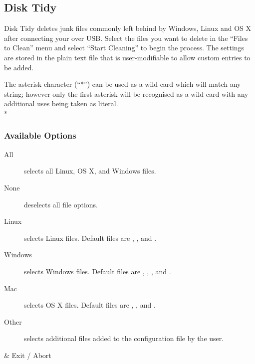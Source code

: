 \subsection{Disk Tidy}
  Disk Tidy deletes junk files commonly left behind by Windows, Linux and
  OS X after connecting your \dap{} over USB. Select the files you want to
  delete in the ``Files to Clean'' menu and select ``Start Cleaning'' to begin
  the process. The settings are stored in the plain text file
   that is user-modifiable to allow
  custom entries to be added.
  
  The asterisk character (``*'') can be used as a wild-card which will match any
  string; however only the first asterisk will be recognised as a wild-card 
  with any additional uses being taken as literal.\\*
  

  \subsubsection{Available Options}
  \begin{description}
    \item[All] selects all Linux, OS X, and Windows files.
    \item[None] deselects all file options.
    \item[Linux] selects Linux files. Default files are
      , , and .
    \item[Windows] selects Windows files. Default files are
      , , ,  and
      .
    \item[Mac] selects OS X files. Default files are , ,
       and .
    \item[Other] selects additional files added to the configuration file by the
                 user.
  \end{description}
  
  \begin{btnmap}
      \ActionStdCancel
      & Exit / Abort\\
  \end{btnmap}
